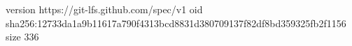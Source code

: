 version https://git-lfs.github.com/spec/v1
oid sha256:12733da1a9b11617a790f4313bcd8831d380709137f82df8bd359325fb2f1156
size 336
